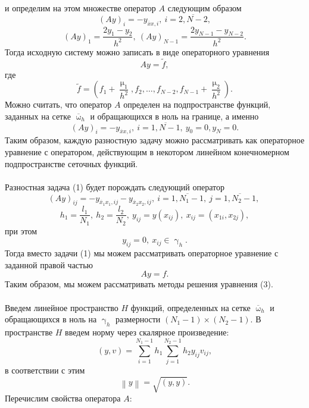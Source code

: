\documentclass[a4paper, 12pt]{report}
\numberwithin{equation}{section}
\newcommand{\ol}{\overline}
\renewcommand{\gamma}{\upgamma}
\renewcommand{\mu}{\upmu}
\renewcommand{\omega}{\upomega}
\newcommand\Norm[1]{\left\| #1 \right\|}
\begin{document}
	и определим на этом множестве оператор $A$ следующим образом $$(Ay)_i = - y_{\ol x x, i},\ i = \ol{2, N-2},$$
	$$(Ay)_1 = \dfrac{2 y_1 - y_2}{h^2},\ (Ay)_{N-1} = \dfrac{2 y_{N-1} - y_{N-2}}{h^2}.$$
	Тогда исходную систему можно записать в виде операторного уравнения
	$$Ay = \tilde f,$$
	где $$\tilde f = \left(f_1 + \dfrac{\mu_1}{h^2}, f_2,\ldots, f_{N-2}, f_{N-1} + \dfrac{\mu_2}{h^2}\right).$$
	Можно считать, что оператор $A$ определен на подпространстве функций, заданных на сетке $\ol \omega_h$ и обращающихся в ноль на границе, а именно
	$$(Ay)_i = - y_{\ol x x, i},\ i = \ol{1, N-1},\ y_0 = 0, y_N = 0.$$
	Таким образом, каждую разностную задачу можно рассматривать как операторное уравнение с оператором, действующим в некотором линейном конечномерном подпространстве сеточных функций.
	\\\\
	Разностная задача (1) будет порождать следующий оператор 
	\begin{equation}
		(Ay)_{ij} = -y_{\ol x_1 x_1, ij} - y_{\ol x_2 x_2 ,ij},\ i = \ol{1, N_1-1},\ j = \ol{1, N_2 - 1},\ 
	\end{equation}
	$$h_1 = \dfrac{l_1}{N_1},\ h_2 = \dfrac{l_2}{N_2}, \ y_{ij} = y(x_{ij}),\ x_{ij} = (x_{1i}, x_{2j}),$$
	при этом
	$$y_{ij} = 0,\ x_{ij} \in \gamma_h.$$
	Тогда вместо задачи (1) мы можем рассматривать операторное уравнение с заданной правой частью
	\begin{equation}
		Ay = f.
	\end{equation}
	Таким образом, мы можем рассматривать методы решения уравнения (3).\\\\
	Введем линейное пространство $H$ функций, определенных на сетке $\ol \omega_h$ и обращающихся в ноль на $\gamma_h$ размерности $(N_1 - 1)\times (N_2 - 1)$. В пространстве $H$ введем норму через скалярное произведение:
	$$(y, v) = \sum_{i=1}^{N_1 - 1}h_1 \sum_{j=1}^{N_2 - 1}h_2 y_{ij}v_{ij},$$
	в соответствии с этим
	$$\Norm{y} = \sqrt{(y,y)}.$$
	Перечислим свойства оператора $A$:
\end{document}
